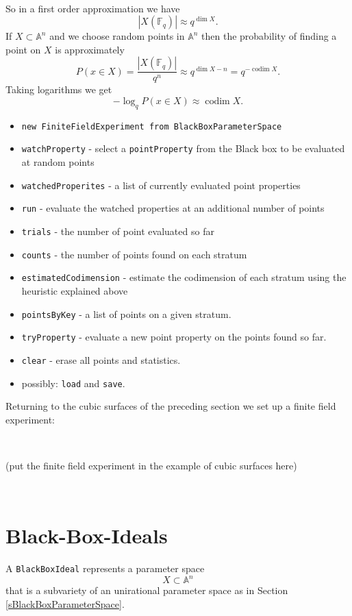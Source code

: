 \documentclass[12pt,a4paper]{amsart}
\theoremstyle{plain}
\theoremstyle{definition}
\newcommand{\FF}{\mathbb F}
\renewcommand{\AA}{\mathbb A}
\DeclareMathOperator{\codim}{codim}
\begin{document}
\

So in a first order approximation we have
\[
	|X(\FF_q) | \approx q^{\dim X}.
\]
If $X \subset \AA^n$ and we choose random points in $\AA^n$ then the probability of finding a point on $X$ is approximately
\[
	P(x \in X) = \frac{|X(\FF_q)|}{q^n} \approx q^{\dim X - n} = q^{-\codim X}.
\]
Taking logarithms we get
\[
	- \log_q P(x \in X) \approx \codim X.
\]

\begin{itemize}
\item {\tt new FiniteFieldExperiment from BlackBoxParameterSpace}
\item {\tt watchProperty} - select a {\tt pointProperty} from the Black box to be evaluated at random points
\item {\tt watchedProperites} - a list of currently evaluated point properties
\item {\tt run} - evaluate the watched properties at an additional number of points
\item {\tt trials} - the number of point evaluated so far
\item {\tt counts} - the number of points found on each stratum
\item {\tt estimatedCodimension} - estimate the codimension of each stratum using the heuristic explained above
\item {\tt pointsByKey} - a list of points on a given stratum. 
\item {\tt tryProperty} -  evaluate a new point property on the points found so far.
\item {\tt clear} - erase all points and statistics.
\item {\color{red} possibly:} {\tt load} and {\tt save}.
\end{itemize}

Returning to the cubic surfaces of the preceding section we set up a finite field experiment:


\

{\color{red} (put the finite field experiment in the example of cubic surfaces here)}

\

\section{Black-Box-Ideals}

A {\tt BlackBoxIdeal} represents a parameter space 
\[
	X \subset \AA^n
\]
that is a subvariety of an unirational parameter space as in Section \ref{sBlackBoxParameterSpace}.
\end{document}
